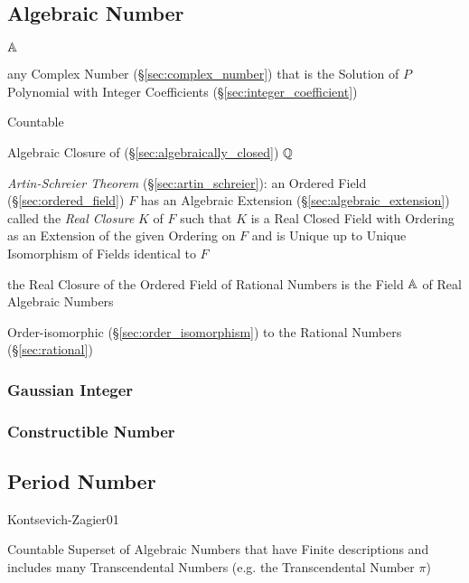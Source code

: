 \subsection{Algebraic Number}\label{sec:algebraic_number}

$\mathbb{A}$

any Complex Number (\S\ref{sec:complex_number}) that is the Solution of $P$
Polynomial with Integer Coefficients (\S\ref{sec:integer_coefficient})

Countable

Algebraic Closure of (\S\ref{sec:algebraically_closed}) $\mathbb{Q}$

\emph{Artin-Schreier Theorem} (\S\ref{sec:artin_schreier}):
an Ordered Field (\S\ref{sec:ordered_field}) $F$ has an Algebraic Extension
(\S\ref{sec:algebraic_extension}) called the \emph{Real Closure} $K$ of $F$
such that $K$ is a Real Closed Field with Ordering as an Extension of the given
Ordering on $F$ and is Unique up to Unique Isomorphism of Fields identical to
$F$

the Real Closure of the Ordered Field of Rational Numbers is the Field
$\mathbb{A}$ of Real Algebraic Numbers

Order-isomorphic (\S\ref{sec:order_isomorphism}) to the Rational
Numbers (\S\ref{sec:rational})



\subsubsection{Gaussian Integer}\label{sec:gaussian_integer}\hfill

\subsubsection{Constructible Number}\label{sec:constructible_number}\hfill



\subsection{Period Number}\label{sec:period_number}

Kontsevich-Zagier01

Countable Superset of Algebraic Numbers that have Finite descriptions
and includes many Transcendental Numbers (e.g. the Transcendental
Number $\pi$)



